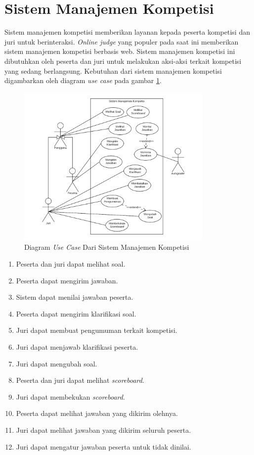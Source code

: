 \section{Sistem Manajemen Kompetisi}

\par Sistem manajemen kompetisi memberikan layanan kepada peserta kompetisi dan juri untuk berinteraksi. \textit{Online judge} yang populer pada saat ini memberikan sistem manajemen kompetisi berbasis web. Sistem manajemen kompetisi ini dibutuhkan oleh peserta dan juri untuk melakukan aksi-aksi terkait kompetisi yang sedang berlangsung. Kebutuhan dari sistem manajemen kompetisi digambarkan oleh diagram \textit{use case} pada gambar \ref{fig:oj-use-case}.

\begin{figure}[ht!]
    \centering
    \includegraphics[width=0.85\textwidth]{images/oj-use-case}
    \caption{Diagram \textit{Use Case} Dari Sistem Manajemen Kompetisi}
    \label{fig:oj-use-case}
\end{figure}

\begin{enumerate}
    \item Peserta dan juri dapat melihat soal.
    \item Peserta dapat mengirim jawaban.
    \item Sistem dapat menilai jawaban peserta.
    \item Peserta dapat mengirim klarifikasi soal.
    \item Juri dapat membuat pengumuman terkait kompetisi.
    \item Juri dapat menjawab klarifikasi peserta.
    \item Juri dapat mengubah soal.
    \item Peserta dan juri dapat melihat \textit{scoreboard}.
    \item Juri dapat membekukan \textit{scoreboard}.
    \item Peserta dapat melihat jawaban yang dikirim olehnya.
    \item Juri dapat melihat jawaban yang dikirim seluruh peserta.
    \item Juri dapat mengatur jawaban peserta untuk tidak dinilai.
\end{enumerate}

